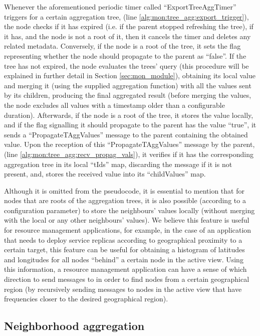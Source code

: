 Whenever the aforementioned periodic timer called ``ExportTreeAggTimer'' triggers for a certain aggregation tree, (line \ref{alg:mon:tree_agg:export_trigger}), the node checks if it has expired (i.e. if the parent stopped refreshing the tree), if it has, and the node is not a root of it, then it cancels the timer and deletes any related metadata. Conversely, if the node is a root of the tree, it sets the flag representing whether the node should propagate to the parent as ``false''. If the tree has not expired, the node evaluates the trees' query (this procedure will be explained in further detail in Section \ref{sec:mon_module}), obtaining its local value and merging it (using the supplied aggregation function) with all the values sent by its children, producing the final aggregated result (before merging the values, the node excludes all values with a timestamp older than a configurable duration).  Afterwards, if the node is a root of the tree, it stores the value locally, and if the flag signalling it should propagate to the parent has the value ``true'', it sends a ``PropagateTAggValues'' message to the parent containing the obtained value. Upon the reception of this ``PropagateTAggValues'' message by the parent, (line \ref{alg:mon:tree_agg:recv_propag_vals}), it verifies if it has the corresponding aggregation tree in its local ``tIds'' map, discarding the message if it is not present, and, stores the received value into its ``childValues'' map.

Although it is omitted from the pseudocode, it is essential to mention that for nodes that are roots of the aggregation trees, it is also possible (according to a configuration parameter) to store the neighbours' values locally (without merging with the local or any other neighbours' values). We believe this feature is useful for resource management applications, for example, in the case of an application that needs to deploy service replicas according to geographical proximity to a certain target, this feature can be useful for obtaining a histogram of latitudes and longitudes for all nodes ``behind'' a certain node in the active view. Using this information, a resource management application can have a sense of which direction to send messages to in order to find nodes from a certain geographical region (by recursively sending messages to nodes in the active view that have frequencies closer to the desired geographical region).

\subsection{Neighborhood aggregation} \label{sec:mon_protocol:neigh_agg}


